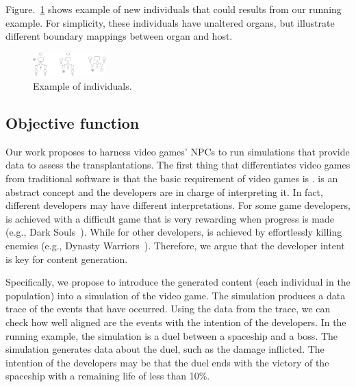 Figure.~\ref{fig:candidates} shows example of new individuals that could results from our running example. For simplicity, these individuals have unaltered organs, but illustrate different boundary mappings between organ and host.

\begin{figure}[tb]
    \centering
    \includegraphics[width=0.25\textwidth]{Figures/candidates.png}
    \caption{Example of individuals.}
    \label{fig:candidates}
\end{figure}

\subsection{Objective function}

Our work proposes to harness video games' NPCs to run simulations that provide data to assess the transplantations. The first thing that differentiates video games from traditional software is that the basic requirement of video games is .  is an abstract concept and the developers are in charge of interpreting it. In fact, different developers may have different interpretations. For some game developers,  is achieved with a difficult game that is very rewarding when progress is made (e.g., Dark Souls~\cite{darksouls}). While for other developers,  is achieved by effortlessly killing enemies (e.g., Dynasty Warriors~\cite{dynastywarriors}). Therefore, we argue that the developer intent is key for content generation.

Specifically, we propose to introduce the generated content (each individual in the population) into a simulation of the video game. The simulation produces a data trace of the events that have occurred. Using the data from the trace, we can check how well aligned are the events with the intention of the developers. In the running example, the simulation is a duel between a spaceship and a boss. The simulation generates data about the duel, such as the damage inflicted. The intention of the developers may be that the duel ends with the victory of the spaceship with a remaining life of less than 10\%.

